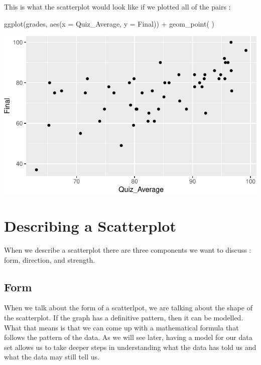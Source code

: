 \documentclass[
  letterpaper,
  DIV=11,
  numbers=noendperiod]{scrreprt}
\newenvironment{Shaded}{\begin{snugshade}}{\end{snugshade}}
\newcommand{\AttributeTok}[1]{\textcolor[rgb]{0.40,0.45,0.13}{#1}}
\newcommand{\FunctionTok}[1]{\textcolor[rgb]{0.28,0.35,0.67}{#1}}
\newcommand{\NormalTok}[1]{\textcolor[rgb]{0.00,0.23,0.31}{#1}}
\newcommand{\SpecialCharTok}[1]{\textcolor[rgb]{0.37,0.37,0.37}{#1}}
\begin{document}
This is what the scatterplot would look like if we plotted all of the
pairs :

\begin{Shaded}
\begin{Highlighting}[]
\FunctionTok{ggplot}\NormalTok{(grades, }\FunctionTok{aes}\NormalTok{(}\AttributeTok{x =}\NormalTok{ Quiz\_Average, }\AttributeTok{y =}\NormalTok{ Final)) }\SpecialCharTok{+}
  \FunctionTok{geom\_point}\NormalTok{( )}
\end{Highlighting}
\end{Shaded}

\includegraphics{Scatterplots_and_Correlation_files/figure-pdf/unnamed-chunk-4-1.pdf}

\section*{Describing a Scatterplot}\label{describing-a-scatterplot}


When we describe a scatterplot there are three components we want to
discuss : form, direction, and strength.

\subsection*{Form}\label{form}

When we talk about the form of a scatterlpot, we are talking about the
shape of the scatterplot. If the graph has a definitive pattern, then it
can be modelled. What that means is that we can come up with a
mathematical formula that follows the pattern of the data. As we will
see later, having a model for our data set allows us to take deeper
steps in understanding what the data has told us and what the data may
still tell us.
\end{document}
